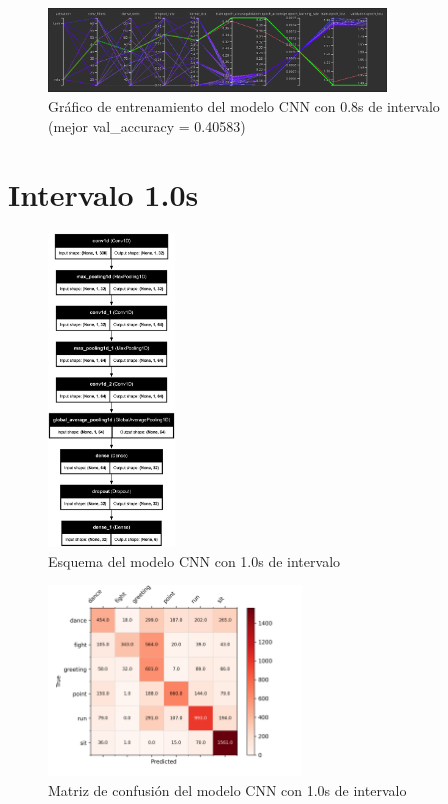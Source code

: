 \begin{figure}[H]
    \centering
    \includegraphics[width=0.8\textwidth]{Imagenes/Bitmap/tb-cnn-0.8.png}
    \caption{Gráfico de entrenamiento del modelo CNN con 0.8s de intervalo (mejor val\_accuracy = 0.40583)}
    \label{fig:cnn-0.8-grafico}
\end{figure}

\section{Intervalo 1.0s}

\begin{figure}[H]
    \centering
    \includegraphics[width=0.3\textwidth]{Imagenes/Bitmap/best-cnn1.0.png}
    \caption{Esquema del modelo CNN con 1.0s de intervalo}
    \label{fig:cnn-1.0-final}
\end{figure}

\begin{figure}[H]
    \centering
    \includegraphics[width=0.6\textwidth]{Imagenes/Bitmap/CM_best-cnn1.0.png}
    \caption{Matriz de confusión del modelo CNN con 1.0s de intervalo}
    \label{fig:cnn-1.0-matriz}
\end{figure}

